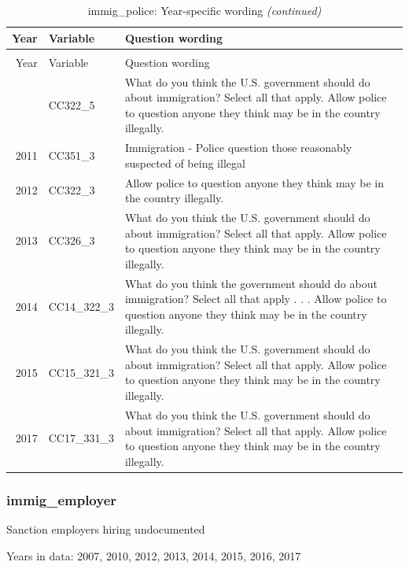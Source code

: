 \documentclass[12pt]{article}
\begin{document}
\begin{longtable}[t]{rl>{\raggedright\arraybackslash}p{10cm}}
\caption{\label{tab:unnamed-chunk-4}immig\_police: Year-specific wording}\\
\toprule
Year & Variable & Question wording\\
\midrule
\endfirsthead
\caption[]{immig\_police: Year-specific wording \textit{(continued)}}\\
\toprule
Year & Variable & Question wording\\
\midrule
\endhead
\
\endfoot
\bottomrule
\endlastfoot
2010 & CC322\_5 & What do you think the U.S. government should do about immigration? Select all that apply. Allow police to question anyone they think may be in the country illegally.\\
2011 & CC351\_3 & Immigration - Police question those reasonably suspected of being illegal\\
2012 & CC322\_3 & Allow police to question anyone they think may be in the country illegally.\\
2013 & CC326\_3 & What do you think the U.S. government should do about immigration? Select all that apply. Allow police to question anyone they think may be in the country illegally.\\
2014 & CC14\_322\_3 & What do you think the government should do about immigration? Select all that apply . . . Allow police to question anyone they think may be in the country illegally.\\
2015 & CC15\_321\_3 & What do you think the U.S. government should do about immigration? Select all that apply. Allow police to question anyone they think may be in the country illegally.\\
2017 & CC17\_331\_3 & What do you think the U.S. government should do about immigration? Select all that apply. Allow police to question anyone they think may be in the country illegally.\\*
\end{longtable}

\subsubsection{immig\_employer}\label{immig_employer}

Sanction employers hiring undocumented

Years in data: 2007, 2010, 2012, 2013, 2014, 2015, 2016,
2017\begingroup\fontsize{10}{12}\selectfont
\end{document}
